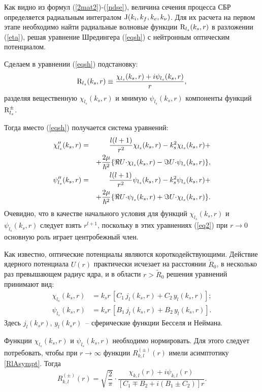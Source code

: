 Как видно из формул (\ref{2mat2})-(\ref{ndse}),  величина сечения процесса СБР
определяется радиальным интегралом
${\rm J}(k_i, k_f, k_e, k_\nu)$. Для их расчета на первом этапе
необходимо найти радиальные волновые функции
${\rm R}_{l_s}(k_s, r)$ в
разложении (\ref{eta}),
решая уравнение
Шредингера (\ref{eqsh}) с нейтронным оптическим потенциалом.

Сделаем в уравнении (\ref{eqsh}) подстановку:
\begin{eqnarray}\label{chi}
{\rm R}_{l_s}(k_s,r) \equiv {{\chi_{l_s}(k_s,r) + i \psi_{l_s}(k_s,r)}\over r},
\end{eqnarray}
разделяя вещественную $\chi_{l_s}(k_s,r)$ и мнимую $\psi_{l_s}(k_s,r)$
компоненты функций ${\rm R}^{\pm}_{l_s}$.

Тогда вместо (\ref{eqsh}) получается система уравнений:
\begin{eqnarray}\label{eq2}
\chi''_{l_s}(k_s,r)&=&{{l(l+1)}\over{r^2}}\chi_{l_s}(k_s,r)-k^2_s \chi_{l_s}(k_s,r)+\nonumber\\
&&+{{2\mu}
\over{\hbar^2}}\{\Re U {\cdot} \chi_{l_s}(k_s,r)-\Im U {\cdot} \psi_{l_s}(k_s,r)\},\nonumber\\
\psi''_{l_s}(k_s,r)&=&{{l(l+1)}\over{r^2}}\psi_{l_s}(k_s,r)-k^2_s \psi_{l_s}(k_s,r)+\nonumber\\
&&+{{2\mu}
\over{\hbar^2}}\{\Re U {\cdot} \psi_{l_s}(k_s,r)+\Im U {\cdot} \chi_{l_s}(k_s,r)\}.
\end{eqnarray}
Очевидно, что в качестве начального условия для функций $\chi_{l_s}(k_s,r)$
и $\psi_{l_s}(k_s,r)$ следует взять $r^{l+1}$, поскольку в этих
уравнениях (\ref{eq2})
при $r \to 0$ основную роль играет центробежный член.

Как известно, оптические потенциалы являются короткодействующими. Действие
 ядерного потенциала $U(r)$ практически исчезает на расстоянии $\tilde R_0$,
в несколько раз превышающем радиус ядра, и в области $r>\tilde R_0$ решения уравнений
принимают вид:
\begin{equation}
\label{Free}
\begin{split}
\chi_{l_s}(k_s, r)&=k_s r\,[C_1\,j_l(k_s, r)+C_2\, y_l(k_s, r)];\\
\psi_{l_s}(k_s, r)&=k_s r\,[B_1\,j_l(k_s, r)+B_2\, y_l(k_s, r)].
\end{split}
\end{equation}
Здесь  $j_l(k_s r)$, $y_l(k_s r)$~-- сферические функции Бесселя и
Неймана.

Функции $\chi_{l_s}(k_s, r)$ и $\psi_{l_s}(k_s, r)$
необходимо нормировать. Для этого следует потребовать, чтобы при
$r\to\infty$ функции $R_{k,l}^{(\pm)}(r)$ имели асимптотику \eqref{RlAsympt}.
Тогда
\begin{equation}
\label{Norm}
R_{k,l}^{(\pm)}(r)=\sqrt{\frac{2}{\pi}}\cdot
\frac{\chi_{k,l}(r)+i\psi_{k,l}(r)}{[C_1\mp B_2+i(B_1\pm C_2)]r}.
\end{equation}

